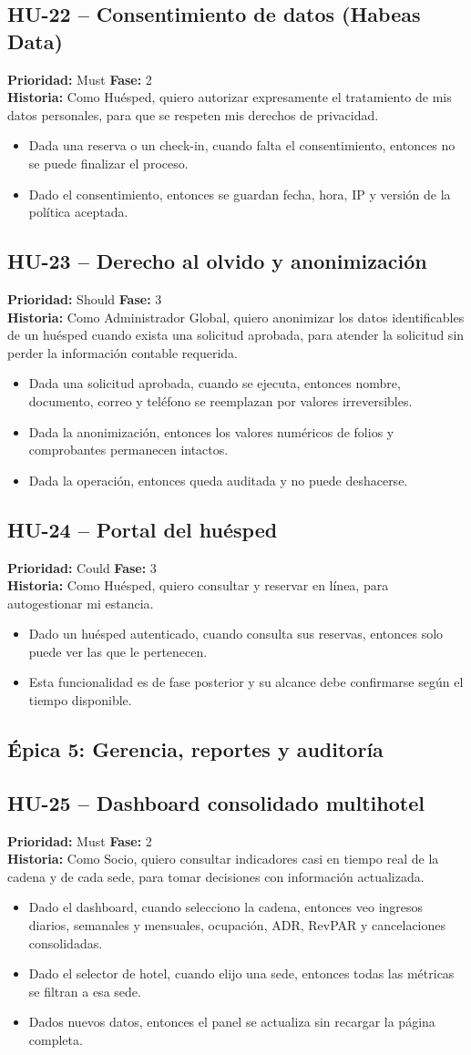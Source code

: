 \documentclass[12pt,a4paper]{article}
\newcommand{\HU}[5]{%
  \subsection*{#1 -- #2}
  \noindent\textbf{Prioridad:} #3 \hfill \textbf{Fase:} #4\\
  \noindent\textbf{Historia:} #5
  \vspace{2mm}
}
\begin{document}
\HU{HU-22}{Consentimiento de datos (Habeas Data)}{Must}{2}{Como Huésped, quiero autorizar expresamente el tratamiento de mis datos personales, para que se respeten mis derechos de privacidad.}
\begin{itemize}
  \item Dada una reserva o un check-in, cuando falta el consentimiento, entonces no se puede finalizar el proceso.
  \item Dado el consentimiento, entonces se guardan fecha, hora, IP y versión de la política aceptada.
\end{itemize}

\HU{HU-23}{Derecho al olvido y anonimización}{Should}{3}{Como Administrador Global, quiero anonimizar los datos identificables de un huésped cuando exista una solicitud aprobada, para atender la solicitud sin perder la información contable requerida.}
\begin{itemize}
  \item Dada una solicitud aprobada, cuando se ejecuta, entonces nombre, documento, correo y teléfono se reemplazan por valores irreversibles.
  \item Dada la anonimización, entonces los valores numéricos de folios y comprobantes permanecen intactos.
  \item Dada la operación, entonces queda auditada y no puede deshacerse.
\end{itemize}

\HU{HU-24}{Portal del huésped}{Could}{3}{Como Huésped, quiero consultar y reservar en línea, para autogestionar mi estancia.}
\begin{itemize}
  \item Dado un huésped autenticado, cuando consulta sus reservas, entonces solo puede ver las que le pertenecen.
  \item Esta funcionalidad es de fase posterior y su alcance debe confirmarse según el tiempo disponible.
\end{itemize}

\subsection{Épica 5: Gerencia, reportes y auditoría}

\HU{HU-25}{Dashboard consolidado multihotel}{Must}{2}{Como Socio, quiero consultar indicadores casi en tiempo real de la cadena y de cada sede, para tomar decisiones con información actualizada.}
\begin{itemize}
  \item Dado el dashboard, cuando selecciono la cadena, entonces veo ingresos diarios, semanales y mensuales, ocupación, ADR, RevPAR y cancelaciones consolidadas.
  \item Dado el selector de hotel, cuando elijo una sede, entonces todas las métricas se filtran a esa sede.
  \item Dados nuevos datos, entonces el panel se actualiza sin recargar la página completa.
\end{itemize}
\end{document}

